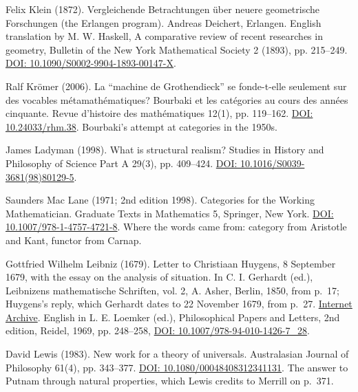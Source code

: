 \noindent Felix Klein (1872). Vergleichende Betrachtungen \"uber neuere geometrische Forschungen (the Erlangen program). Andreas Deichert, Erlangen. English translation by M. W. Haskell, A comparative review of recent researches in geometry, Bulletin of the New York Mathematical Society 2 (1893), pp. 215--249. \href{https://doi.org/10.1090/S0002-9904-1893-00147-X}{DOI: 10.1090/S0002-9904-1893-00147-X}.
\par\medskip

\noindent Ralf Kr\"omer (2006). La ``machine de Grothendieck'' se fonde-t-elle seulement sur des vocables m\'etamath\'ematiques? Bourbaki et les cat\'egories au cours des ann\'ees cinquante. Revue d'histoire des math\'ematiques 12(1), pp. 119--162. \href{https://doi.org/10.24033/rhm.38}{DOI: 10.24033/rhm.38}. Bourbaki's attempt at categories in the 1950s.
\par\medskip

\noindent James Ladyman (1998). What is structural realism? Studies in History and Philosophy of Science Part A 29(3), pp. 409--424. \href{https://doi.org/10.1016/S0039-3681(98)80129-5}{DOI: 10.1016/S0039-3681(98)80129-5}.
\par\medskip

\noindent Saunders Mac Lane (1971; 2nd edition 1998). Categories for the Working Mathematician. Graduate Texts in Mathematics 5, Springer, New York. \href{https://doi.org/10.1007/978-1-4757-4721-8}{DOI: 10.1007/978-1-4757-4721-8}. Where the words came from: category from Aristotle and Kant, functor from Carnap.
\par\medskip

\noindent Gottfried Wilhelm Leibniz (1679). Letter to Christiaan Huygens, 8 September 1679, with the essay on the analysis of situation. In C. I. Gerhardt (ed.), Leibnizens mathematische Schriften, vol. 2, A. Asher, Berlin, 1850, from p.~17; Huygens's reply, which Gerhardt dates to 22 November 1679, from p.~27. \href{https://archive.org/details/leibnizensmathe08leibgoog}{Internet Archive}. English in L. E. Loemker (ed.), Philosophical Papers and Letters, 2nd edition, Reidel, 1969, pp. 248--258, \href{https://doi.org/10.1007/978-94-010-1426-7_28}{DOI: 10.1007/978-94-010-1426-7\_28}.
\par\medskip

\noindent David Lewis (1983). New work for a theory of universals. Australasian Journal of Philosophy 61(4), pp. 343--377. \href{https://doi.org/10.1080/00048408312341131}{DOI: 10.1080/00048408312341131}. The answer to Putnam through natural properties, which Lewis credits to Merrill on p.~371.
\par\medskip


